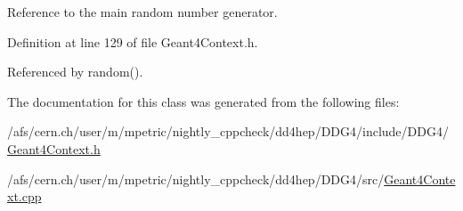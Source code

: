 Reference to the main random number generator. 

Definition at line 129 of file Geant4Context.h.

Referenced by random().

The documentation for this class was generated from the following files:\begin{DoxyCompactItemize}
\item 
/afs/cern.ch/user/m/mpetric/nightly\_\-cppcheck/dd4hep/DDG4/include/DDG4/\hyperlink{_geant4_context_8h}{Geant4Context.h}\item 
/afs/cern.ch/user/m/mpetric/nightly\_\-cppcheck/dd4hep/DDG4/src/\hyperlink{_geant4_context_8cpp}{Geant4Context.cpp}\end{DoxyCompactItemize}
